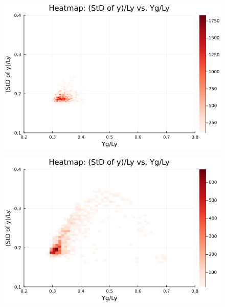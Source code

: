 \begin{figure}[H]
  \centering
  \includegraphics[scale=0.6]{image/RaRtmap10_heat/2023-12-28T12:38:51.912_map_10times_chi1.265_Ay50_rho0.4_T0.43_dT0.04_Rd0.0_Rt0.25_Ra0.0_g0.0003999718779659611_run4.0e8.png}
  \label{}
\end{figure}

\begin{figure}[H]
  \centering
  \includegraphics[scale=0.6]{image/RaRtmap10_heat/2023-12-28T12:38:51.994_map_10times_chi1.265_Ay50_rho0.4_T0.43_dT0.04_Rd0.0_Rt0.25_Ra0.4693845_g0.0003999718779659611_run4.0e8.png}
  \label{}
\end{figure}

